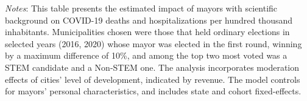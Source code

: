 \documentclass[
  letterpaper,
  DIV=11,
  numbers=noendperiod]{scrartcl}
\begin{document}
\emph{Notes}: This table presents the estimated impact of mayors with
scientific background on COVID-19 deaths and hospitalizations per
hundred thousand inhabitants. Municipalities chosen were those that held
ordinary elections in selected years (2016, 2020) whose mayor was
elected in the first round, winning by a maximum difference of 10\%, and
among the top two most voted was a STEM candidate and a Non-STEM one.
The analysis incorporates moderation effects of cities' level of
development, indicated by revenue. The model controls for mayors'
personal characteristics, and includes state and cohort fixed-effects.
\end{document}
